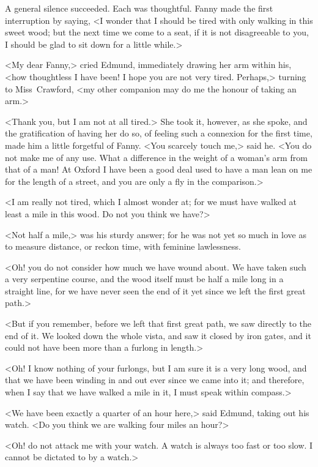 A general silence succeeded. Each was thoughtful. Fanny made the first interruption by saying, <I wonder that I should be tired with only walking in this sweet wood; but the next time we come to a seat, if it is not disagreeable to you, I should be glad to sit down for a little while.>

<My dear Fanny,> cried Edmund, immediately drawing her arm within his, <how thoughtless I have been! I hope you are not very tired. Perhaps,> turning to Miss~Crawford, <my other companion may do me the honour of taking an arm.>

<Thank you, but I am not at all tired.> She took it, however, as she spoke, and the gratification of having her do so, of feeling such a connexion for the first time, made him a little forgetful of Fanny. <You scarcely touch me,> said he. <You do not make me of any use. What a difference in the weight of a woman's arm from that of a man! At Oxford I have been a good deal used to have a man lean on me for the length of a street, and you are only a fly in the comparison.>

<I am really not tired, which I almost wonder at; for we must have walked at least a mile in this wood. Do not you think we have?>

<Not half a mile,> was his sturdy answer; for he was not yet so much in love as to measure distance, or reckon time, with feminine lawlessness.

<Oh! you do not consider how much we have wound about. We have taken such a very serpentine course, and the wood itself must be half a mile long in a straight line, for we have never seen the end of it yet since we left the first great path.>

<But if you remember, before we left that first great path, we saw directly to the end of it. We looked down the whole vista, and saw it closed by iron gates, and it could not have been more than a furlong in length.>

<Oh! I know nothing of your furlongs, but I am sure it is a very long wood, and that we have been winding in and out ever since we came into it; and therefore, when I say that we have walked a mile in it, I must speak within compass.>

<We have been exactly a quarter of an hour here,> said Edmund, taking out his watch. <Do you think we are walking four miles an hour?>

<Oh! do not attack me with your watch. A watch is always too fast or too slow. I cannot be dictated to by a watch.>

